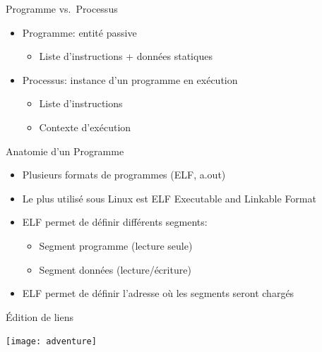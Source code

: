 \documentclass[11pt]{beamer}
\author{Pablo Oliveira [pablo.oliveira@uvsq.fr]}
\begin{document}
\maketitle


\begin{frame}{Programme vs.~Processus}
\begin{itemize}
\item
  Programme: entité passive

  \begin{itemize}
  \item
    Liste d'instructions + données statiques
  \end{itemize}
\item
  Processus: instance d'un programme en exécution

  \begin{itemize}
  \item
    Liste d'instructions
  \item
    Contexte d'exécution
  \end{itemize}
\end{itemize}

\end{frame}

\begin{frame}{Anatomie d'un Programme}

\begin{itemize}
\item
  Plusieurs formats de programmes (ELF, a.out)
\item
  Le plus utilisé sous Linux est ELF Executable and Linkable Format
\item
  ELF permet de définir différents segments:

  \begin{itemize}
  \item
    Segment programme (lecture seule)
  \item
    Segment données (lecture/écriture)
  \end{itemize}
\item
  ELF permet de définir l'adresse où les segments seront chargés
\end{itemize}

\end{frame}

\begin{slide}{Édition de liens}
\centerline{\texttt{[image: adventure]}}
\bigskip
{}
\end{slide}
\end{document}
